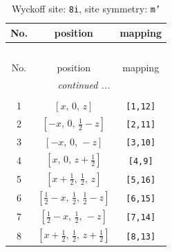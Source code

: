 \documentclass[fleqn,8pt]{jsarticle}
\begin{document}
\begin{longtable}{ccc}
\caption{Wyckoff site: {\tt 8i}, site symmetry: {\tt m'}}
 \\
 \hline \hline
No. & position & mapping \\ \hline \endfirsthead

\multicolumn{2}{l}{\tablename\ \thetable{}} \\
 \hline \hline
No. & position & mapping \\ \hline \endhead

 \hline \hline
\multicolumn{2}{r}{\footnotesize\it continued ...} \\ \endfoot

 \hline \hline
\multicolumn{2}{r}{} \\ \endlastfoot

1 & $\left[ x,\, 0,\, z \right]$ & {\tt [1,12]} \\ \hline
2 & $\left[ - x,\, 0,\, \frac{1}{2} - z \right]$ & {\tt [2,11]} \\ \hline
3 & $\left[ - x,\, 0,\, - z \right]$ & {\tt [3,10]} \\ \hline
4 & $\left[ x,\, 0,\, z + \frac{1}{2} \right]$ & {\tt [4,9]} \\ \hline
5 & $\left[ x + \frac{1}{2},\, \frac{1}{2},\, z \right]$ & {\tt [5,16]} \\ \hline
6 & $\left[ \frac{1}{2} - x,\, \frac{1}{2},\, \frac{1}{2} - z \right]$ & {\tt [6,15]} \\ \hline
7 & $\left[ \frac{1}{2} - x,\, \frac{1}{2},\, - z \right]$ & {\tt [7,14]} \\ \hline
8 & $\left[ x + \frac{1}{2},\, \frac{1}{2},\, z + \frac{1}{2} \right]$ & {\tt [8,13]} \\
\end{longtable}
\renewcommand{\arraystretch}{1.2}
\end{document}
